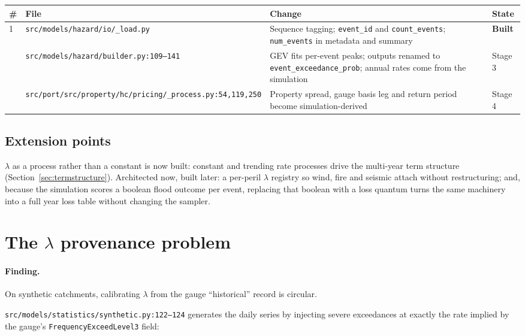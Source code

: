 \documentclass[11pt]{article}
\begin{document}
\begin{longtable}{@{}p{}p{}p{}p{}@{}}
\toprule
\textbf{\#} & \textbf{File} & \textbf{Change} & \textbf{State} \\
\midrule
\endhead
1 & \texttt{src/models/hazard/io/\_load.py} & Sequence tagging;
\texttt{event\_id} and \texttt{count\_events}; \texttt{num\_events} in metadata
and summary & \textbf{Built} \\
\addlinespace
2 & \texttt{src/models/hazard/\linebreak[0]builder.py:109--141} & GEV fits per-event peaks;
outputs renamed to \texttt{event\_exceedance\_prob}; annual rates come from the
simulation & Stage 3 \\
\addlinespace
3 & \texttt{src/port/src/property/}\texttt{hc/pricing/\_process.py:}\texttt{54,119,250} & Property
spread, gauge basis leg and return period become simulation-derived & Stage 4 \\
\bottomrule
\end{longtable}

\subsection{Extension points}

$\lambda$ as a process rather than a constant is now built: constant and trending
rate processes drive the multi-year term structure
(Section~\ref{sec:termstructure}). Architected now, built later: a per-peril $\lambda$
registry so wind, fire and seismic attach without restructuring; and, because
the simulation scores a boolean flood outcome per event, replacing that boolean
with a loss quantum turns the same machinery into a full year loss table without
changing the sampler.

\section{The $\lambda$ provenance problem}
\label{sec:provenance}

\paragraph{Finding.}
On synthetic catchments, calibrating $\lambda$ from the gauge ``historical''
record is circular.

\texttt{src/models/statistics/synthetic.py:122--124} generates the daily series
by injecting severe exceedances at exactly the rate implied by the gauge's
\texttt{FrequencyExceedLevel3} field:
\end{document}
